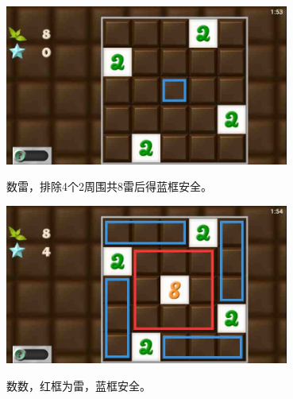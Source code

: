 \subsection{} %
\begin{center}
    \includegraphics[width=0.7\textwidth]{puzzlelow/49-1.jpg}
\end{center}
数雷，排除4个2周围共8雷后得蓝框安全。
\begin{center}
    \includegraphics[width=0.7\textwidth]{puzzlelow/49-2.jpg}
\end{center}
数数，红框为雷，蓝框安全。


